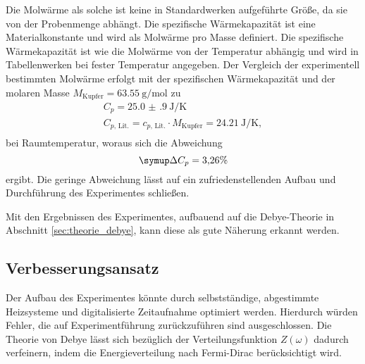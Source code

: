 Die Molwärme als solche ist keine in Standardwerken aufgeführte Größe, da sie von der Probenmenge abhängt.
Die spezifische Wärmekapazität ist eine Materialkonstante und wird als Molwärme pro Masse definiert.
Die spezifische Wärmekapazität ist wie die Molwärme von der Temperatur abhängig und wird in Tabellenwerken bei fester Temperatur angegeben.
Der Vergleich der experimentell bestimmten Molwärme erfolgt mit der spezifischen Wärmekapazität und der molaren Masse $M_{\text{Kupfer}}=\SI{63.55}{\gram\per\mol}$ zu
\begin{align}
	C_{p} =\SI{25.0(9)}{\joule\per\kelvin}\\
	C_{p,\,\text{Lit.}} = c_{p,\,\text{Lit.}}\cdot M_{\text{Kupfer}}= \SI{24.21}{\joule\per\kelvin},\\
\end{align}
bei Raumtemperatur, woraus sich die Abweichung
\begin{equation}
	\symup\Delta C_p = 3{,}26 \%
\end{equation}
ergibt.
Die geringe Abweichung lässt auf ein zufriedenstellenden Aufbau und Durchführung des Experimentes schließen.

Mit den Ergebnissen des Experimentes, aufbauend auf die Debye-Theorie in Abschnitt \ref{sec:theorie_debye}, 
kann diese als gute Näherung erkannt werden.

\subsection{Verbesserungsansatz}
Der Aufbau des Experimentes könnte durch selbstständige, abgestimmte Heizsysteme und digitalisierte Zeitaufnahme optimiert werden.
Hierdurch würden Fehler, die auf Experimentführung zurückzuführen sind ausgeschlossen.
Die Theorie von Debye lässt sich bezüglich der Verteilungsfunktion $Z(\omega)$ dadurch verfeinern, 
indem die Energieverteilung nach Fermi-Dirac berücksichtigt wird. 
\newpage